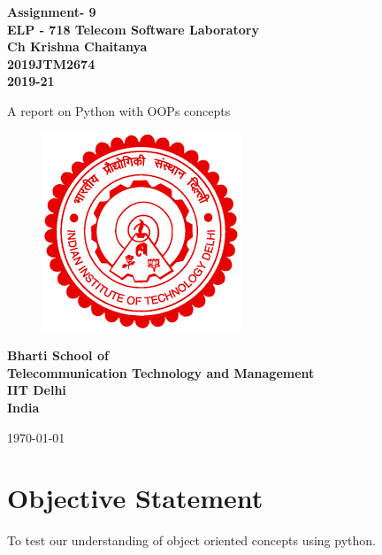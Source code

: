 \documentclass[12pt]{article}
\begin{document}
  \begin{titlepage}
    \begin{center}
      \begin{Large}
      \textbf{ Assignment- 9\\
       \vspace*{0.5cm}
       ELP - 718 Telecom Software Laboratory\\
       \vspace{1cm}
       Ch Krishna Chaitanya\\
       2019JTM2674\\
       2019-21\\}
      \end{Large}
       \vspace{1cm}
      {\Large  A report on Python with OOPs concepts}
       \vfill
       \begin{figure}[h!]
          \centering
          \includegraphics{iitdelhi.png}
       \end{figure}
       \vfill
      \begin{Large}
      \textbf{ Bharti School of \\
       Telecommunication Technology and Management\\
       IIT Delhi\\
       India\\
      }\end{Large}
       \medskip
       \today
    \end{center}
    \vfill
  \end{titlepage}
  
  \tableofcontents
  
  \clearpage
  \section*{Objective Statement}
   To test our understanding of object oriented concepts using python.
\end{document}
